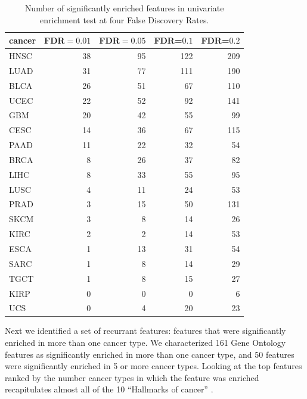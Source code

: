 \begin{table}
  \centering
  \begin{tabular}{l|r|r|r|r}
\hline
cancer & FDR$=0.01$ & FDR$=0.05$ & FDR=$0.1$ & FDR=$0.2$ \\
\hline
HNSC & 38 & 95 & 122 & 209\\

LUAD & 31 & 77 & 111 & 190\\

BLCA & 26 & 51 & 67 & 110\\

UCEC & 22 & 52 & 92 & 141\\

GBM & 20 & 42 & 55 & 99\\

CESC & 14 & 36 & 67 & 115\\

PAAD & 11 & 22 & 32 & 54\\

BRCA & 8 & 26 & 37 & 82\\

LIHC & 8 & 33 & 55 & 95\\

LUSC & 4 & 11 & 24 & 53\\

PRAD & 3 & 15 & 50 & 131\\

SKCM & 3 & 8 & 14 & 26\\

KIRC & 2 & 2 & 14 & 53\\

ESCA & 1 & 13 & 31 & 54\\

SARC & 1 & 8 & 14 & 29\\

TGCT & 1 & 8 & 15 & 27\\

KIRP & 0 & 0 & 0 & 6\\

UCS & 0 & 4 & 20 & 23\\

  \end{tabular}\label{tab:univariateFDR}
\caption{Number of significantly enriched features in univariate enrichment test at four False Discovery Rates.}
\end{table}

Next we identified a set of recurrant features: features that were significantly enriched in more than one cancer type.  We characterized 161 Gene Ontology features as significantly enriched in more than one cancer type, and 50 features were significantly enriched in 5 or more cancer types.  Looking at the top features ranked by the number cancer types in which the feature was enriched recapitulates almost all of the 10 ``Hallmarks of cancer'' \cite{Hanahan_2011}.

